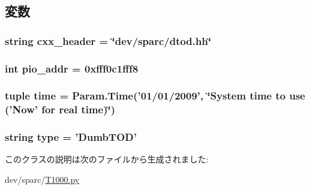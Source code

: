 \subsection{変数}
\hypertarget{classT1000_1_1DumbTOD_a17da7064bc5c518791f0c891eff05fda}{
\subsubsection[{cxx\_\-header}]{\setlength{\rightskip}{0pt plus 5cm}string {\bf cxx\_\-header} = \char`\"{}dev/sparc/dtod.hh\char`\"{}}}
\label{classT1000_1_1DumbTOD_a17da7064bc5c518791f0c891eff05fda}
\hypertarget{classT1000_1_1DumbTOD_a659450bdbf05cdba8edf24c47df67671}{
\subsubsection[{pio\_\-addr}]{\setlength{\rightskip}{0pt plus 5cm}int {\bf pio\_\-addr} = 0xfff0c1fff8}}
\label{classT1000_1_1DumbTOD_a659450bdbf05cdba8edf24c47df67671}
\hypertarget{classT1000_1_1DumbTOD_a429c35172fbcb8b1788bead147e4719b}{
\subsubsection[{time}]{\setlength{\rightskip}{0pt plus 5cm}tuple {\bf time} = {\bf Param.Time}('01/01/2009', \char`\"{}System {\bf time} to use ('Now' for real {\bf time})\char`\"{})}}
\label{classT1000_1_1DumbTOD_a429c35172fbcb8b1788bead147e4719b}
\hypertarget{classT1000_1_1DumbTOD_acce15679d830831b0bbe8ebc2a60b2ca}{
\subsubsection[{type}]{\setlength{\rightskip}{0pt plus 5cm}string {\bf type} = '{\bf DumbTOD}'}}
\label{classT1000_1_1DumbTOD_acce15679d830831b0bbe8ebc2a60b2ca}


このクラスの説明は次のファイルから生成されました:\begin{DoxyCompactItemize}
\item 
dev/sparc/\hyperlink{T1000_8py}{T1000.py}\end{DoxyCompactItemize}
